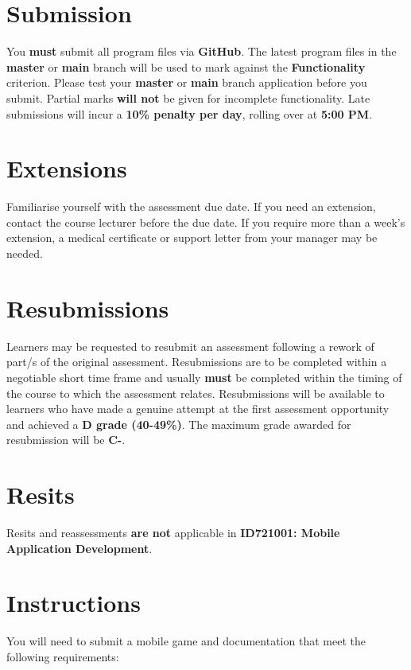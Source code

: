 \documentclass{article}
\begin{document}
\section*{Submission}
You \textbf{must} submit all program files via \textbf{GitHub}. The latest program files in the \textbf{master} or \textbf{main} branch will be used to mark against the \textbf{Functionality} criterion. Please test your \textbf{master} or \textbf{main} branch application before you submit. Partial marks \textbf{will not} be given for incomplete functionality. Late submissions will incur a \textbf{10\% penalty per day}, rolling over at \textbf{5:00 PM}.

\section*{Extensions}
Familiarise yourself with the assessment due date. If you need an extension, contact the course lecturer before the due date. If you require more than a week's extension, a medical certificate or support letter from your manager may be needed.

\section*{Resubmissions}
Learners may be requested to resubmit an assessment following a rework of part/s of the original assessment. Resubmissions are to be completed within a negotiable short time frame and usually \textbf{must} be completed within the timing of the course to which the assessment relates. Resubmissions will be available to learners who have made a genuine attempt at the first assessment opportunity and achieved a \textbf{D grade (40-49\%)}. The maximum grade awarded for resubmission will be \textbf{C-}.

\section*{Resits}
Resits and reassessments \textbf{are not} applicable in \textbf{ID721001: Mobile Application Development}.

\section*{Instructions}
You will need to submit a mobile game and documentation that meet the following requirements:
\end{document}
